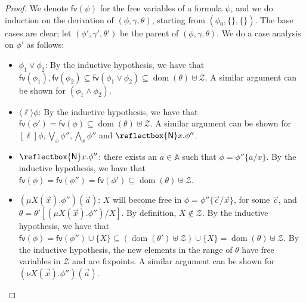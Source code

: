 \documentclass[10pt,a4paper]{article}
\theoremstyle{definition}
\theoremstyle{remark}
\newcommand\new[0]{\reflectbox{\ensuremath{\mathsf{N}}}}
\newcommand\fresh[1]{\new #1.}
\newcommand\fv[0]{\mathsf{fv}}
\DeclareMathOperator{\dom}{dom}
\newcommand\diam[1]{\langle#1\rangle}
\newcommand\sq[1]{[#1]}
\newcommand\Zcal{\mathcal{Z}}
\newcommand\Atoms{\mathbb{A}}
\begin{document}
\begin{proof}
	We denote $\fv(\psi)$ for the free variables of a formula $\psi$, 
	and we do induction on the derivation of $(\phi,\gamma,\theta)$, starting from $(\phi_0,\{\}, \{\})$. 
	The base cases are clear; let $(\phi',\gamma',\theta')$ be the parent of $(\phi, \gamma, \theta)$. 
	We do a case analysis on $\phi'$ as follows:
		\begin{itemize}
		\item $\phi_1 \lor \phi_2$: By the inductive hypothesis,  
		we have that $\fv(\phi_1), \fv(\phi_2) \subseteq \fv(\phi_1 \lor \phi_2) \subseteq \dom(\theta)\uplus \Zcal$.
		A similar argument can be shown for $(\phi_1 \land \phi_2)$.
				\item $\diam{\ell}\phi$: By the inductive hypothesis, 
		we have that $\fv(\phi') = \fv(\phi) \subseteq \dom(\theta) \uplus \Zcal$. 
		A similar argument can be shown for $\sq{\ell}\phi, \bigvee_x \phi'',  \bigwedge_x \phi''$ and $\fresh{x}\phi''$.
				\item $\fresh{x}\phi''$: there exists an $a \in \Atoms$ such that $\phi = \phi''\{a/x\}$. By the inductive hypothesis, we have that $\fv(\phi) = \fv(\phi'') = \fv(\phi') \subseteq \dom(\theta) \uplus \Zcal$.			
				\item $(\mu X(\vec x).\phi'')(\vec a)$: $X$ will become free in $\phi=\phi''\{\vec c/\vec x\}$, for some $\vec c$, and $\theta=\theta'[(\mu X(\vec x).\phi'')/X]$.
		By definition, $X\notin\Zcal$.
		By the inductive hypothesis, we have that 
		$\fv(\phi) =\fv(\phi'') \cup \{X\} \subseteq (\dom(\theta') \uplus \Zcal)\cup \{X\}=\dom(\theta) \uplus \Zcal$. 
		By the inductive hypothesis, the new elements in the range of $\theta$ have free variables in $\Zcal$
		and are fixpoints.
		A similar argument can be shown for $(\nu X(\vec x).\phi'')(\vec a)$.
	\end{itemize}
\end{proof}

\freshClosProps*
\end{document}
